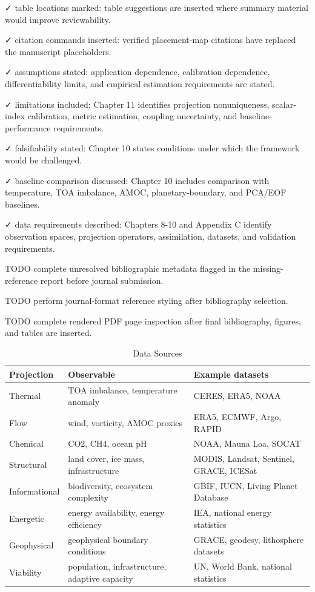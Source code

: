 \documentclass[aps,pre,reprint,superscriptaddress,nofootinbib]{revtex4-2}
\begin{document}
✓ table locations marked: table suggestions are inserted where summary material would improve reviewability.

✓ citation commands inserted: verified placement-map citations have replaced the manuscript placeholders.

✓ assumptions stated: application dependence, calibration dependence, differentiability limits, and empirical estimation requirements are stated.

✓ limitations included: Chapter 11 identifies projection nonuniqueness, scalar-index calibration, metric estimation, coupling uncertainty, and baseline-performance requirements.

✓ falsifiability stated: Chapter 10 states conditions under which the framework would be challenged.

✓ baseline comparison discussed: Chapter 10 includes comparison with temperature, TOA imbalance, AMOC, planetary-boundary, and PCA/EOF baselines.

✓ data requirements described: Chapters 8-10 and Appendix C identify observation spaces, projection operators, assimilation, datasets, and validation requirements.

TODO complete unresolved bibliographic metadata flagged in the missing-reference report before journal submission.

TODO perform journal-format reference styling after bibliography selection.

TODO complete rendered PDF page inspection after final bibliography, figures, and tables are inserted.

\begin{table}
\centering
\caption{Data Sources}
\label{tab:data_sources}
\begin{tabular}{p{}p{}p{}}
\hline
Projection & Observable & Example datasets \\
\hline
Thermal & TOA imbalance, temperature anomaly & CERES, ERA5, NOAA \\
Flow & wind, vorticity, AMOC proxies & ERA5, ECMWF, Argo, RAPID \\
Chemical & CO2, CH4, ocean pH & NOAA, Mauna Loa, SOCAT \\
Structural & land cover, ice mass, infrastructure & MODIS, Landsat, Sentinel, GRACE, ICESat \\
Informational & biodiversity, ecosystem complexity & GBIF, IUCN, Living Planet Database \\
Energetic & energy availability, energy efficiency & IEA, national energy statistics \\
Geophysical & geophysical boundary conditions & GRACE, geodesy, lithosphere datasets \\
Viability & population, infrastructure, adaptive capacity & UN, World Bank, national statistics \\
\hline
\end{tabular}
\end{table}



\end{document}

